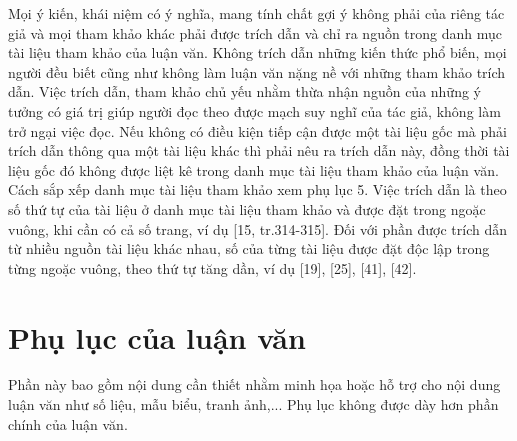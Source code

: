 Mọi ý kiến, khái niệm có ý nghĩa, mang tính chất gợi ý không phải của riêng tác giả và mọi tham khảo khác phải được trích dẫn và chỉ ra nguồn trong danh mục tài liệu tham khảo của luận văn.
Không trích dẫn những kiến thức phổ biến, mọi người đều biết cũng như không làm luận văn nặng nề với những tham khảo trích dẫn.
Việc trích dẫn, tham khảo chủ yếu nhằm thừa nhận nguồn của những ý tưởng có giá trị giúp người đọc theo được mạch suy nghĩ của tác giả, không làm trở ngại việc đọc.
Nếu không có điều kiện tiếp cận được một tài liệu gốc mà phải trích dẫn thông qua một tài liệu khác thì phải nêu ra trích dẫn này, đồng thời tài liệu gốc đó không được liệt kê trong danh mục tài liệu tham khảo của luận văn.
Cách sắp xếp danh mục tài liệu tham khảo xem phụ lục 5.
Việc trích dẫn là theo số thứ tự của tài liệu ở danh mục tài liệu tham khảo và được đặt trong ngoặc vuông, khi cần có cả số trang, ví dụ [15, tr.314-315].
Đối với phần được trích dẫn từ nhiều nguồn tài liệu khác nhau, số của từng tài liệu được đặt độc lập trong từng ngoặc vuông, theo thứ tự tăng dần, ví dụ [19], [25], [41], [42].

\section{Phụ lục của luận văn}

Phần này bao gồm nội dung cần thiết nhằm minh họa hoặc hỗ trợ cho nội dung luận văn như số liệu, mẫu biểu, tranh ảnh,...
Phụ lục không được dày hơn phần chính của luận văn.

